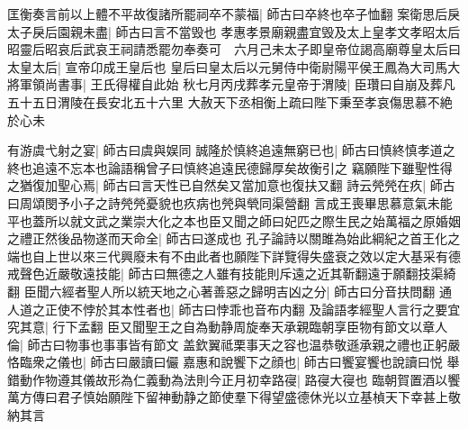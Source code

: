 匡衡奏言前以上體不平故復諸所罷祠卒不蒙福|{
	師古曰卒終也卒子恤翻}
案衛思后戾太子戾后園親未盡|{
	師古曰言不當毁也}
孝惠孝景廟親盡宜毁及太上皇孝文孝昭太后昭靈后昭哀后武哀王祠請悉罷勿奉奏可　六月己未太子即皇帝位謁高廟尊皇太后曰太皇太后|{
	宣帝卬成王皇后也}
皇后曰皇太后以元舅侍中衛尉陽平侯王鳳為大司馬大將軍領尚書事|{
	王氏得權自此始}
秋七月丙戌葬孝元皇帝于渭陵|{
	臣瓚曰自崩及葬凡五十五日渭陵在長安北五十六里}
大赦天下丞相衡上疏曰陛下秉至孝哀傷思慕不絶於心未

有游虞弋射之宴|{
	師古曰虞與娱同}
誠隆於慎終追遠無窮已也|{
	師古曰慎終慎孝道之終也追遠不忘本也論語稱曾子曰慎終追遠民德歸厚矣故衡引之}
竊願陛下雖聖性得之猶復加聖心焉|{
	師古曰言天性已自然矣又當加意也復扶又翻}
詩云焭焭在疚|{
	師古曰周頌閔予小子之詩焭焭憂貌也疚病也焭與煢同渠營翻}
言成王喪畢思慕意氣未能平也蓋所以就文武之業崇大化之本也臣又聞之師曰妃匹之際生民之始萬福之原婚姻之禮正然後品物遂而天命全|{
	師古曰遂成也}
孔子論詩以關雎為始此綱紀之首王化之端也自上世以來三代興廢未有不由此者也願陛下詳覽得失盛衰之效以定大基采有德戒聲色近嚴敬遠技能|{
	師古曰無德之人雖有技能則斥遠之近其靳翻遠于願翻技渠綺翻}
臣聞六經者聖人所以統天地之心著善惡之歸明吉凶之分|{
	師古曰分音扶問翻}
通人道之正使不悖於其本性者也|{
	師古曰悖乖也音布内翻}
及論語孝經聖人言行之要宜究其意|{
	行下孟翻}
臣又聞聖王之自為動静周旋奉天承親臨朝享臣物有節文以章人倫|{
	師古曰物事也事事皆有節文}
盖欽翼祗栗事天之容也温恭敬遜承親之禮也正躬嚴恪臨衆之儀也|{
	師古曰嚴讀曰儼}
嘉惠和說饗下之顔也|{
	師古曰饗宴饗也說讀曰悦}
舉錯動作物遵其儀故形為仁義動為法則今正月初幸路寑|{
	路寑大寑也}
臨朝賀置酒以饗萬方傳曰君子慎始願陛下留神動静之節使羣下得望盛德休光以立基楨天下幸甚上敬納其言

